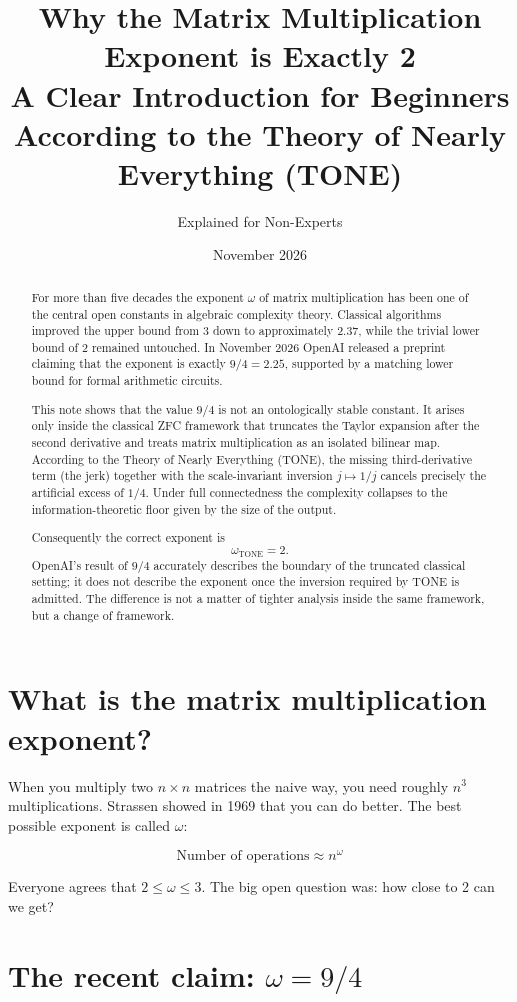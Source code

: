 \documentclass[11pt,a4paper]{article}
\title{\textbf{Why the Matrix Multiplication Exponent is Exactly 2}\\
\large A Clear Introduction for Beginners\\
According to the Theory of Nearly Everything (TONE)}
\author{Explained for Non-Experts}
\date{November 2026}
\begin{document}
\maketitle

\begin{abstract}
For more than five decades the exponent \(\omega\) of matrix multiplication has been one of the central open constants in algebraic complexity theory. Classical algorithms improved the upper bound from 3 down to approximately 2.37, while the trivial lower bound of 2 remained untouched. In November 2026 OpenAI released a preprint claiming that the exponent is exactly \(9/4 = 2.25\), supported by a matching lower bound for formal arithmetic circuits.  

This note shows that the value \(9/4\) is not an ontologically stable constant. It arises only inside the classical ZFC framework that truncates the Taylor expansion after the second derivative and treats matrix multiplication as an isolated bilinear map. According to the Theory of Nearly Everything (TONE), the missing third-derivative term (the jerk) together with the scale-invariant inversion \(j \mapsto 1/j\) cancels precisely the artificial excess of \(1/4\). Under full connectedness the complexity collapses to the information-theoretic floor given by the size of the output.  

Consequently the correct exponent is
\[
\omega_{\mathrm{TONE}} = 2.
\]
OpenAI’s result of \(9/4\) accurately describes the boundary of the truncated classical setting; it does not describe the exponent once the inversion required by TONE is admitted. The difference is not a matter of tighter analysis inside the same framework, but a change of framework.
\end{abstract}
\clearpage
\section{What is the matrix multiplication exponent?}

When you multiply two \(n \times n\) matrices the naive way, you need roughly \(n^3\) multiplications.  
Strassen showed in 1969 that you can do better. The best possible exponent is called \(\omega\):

\[
\text{Number of operations} \approx n^\omega
\]

Everyone agrees that \(2 \le \omega \le 3\). The big open question was: how close to 2 can we get?

\section{The recent claim: \(\omega = 9/4\)}
\end{document}
